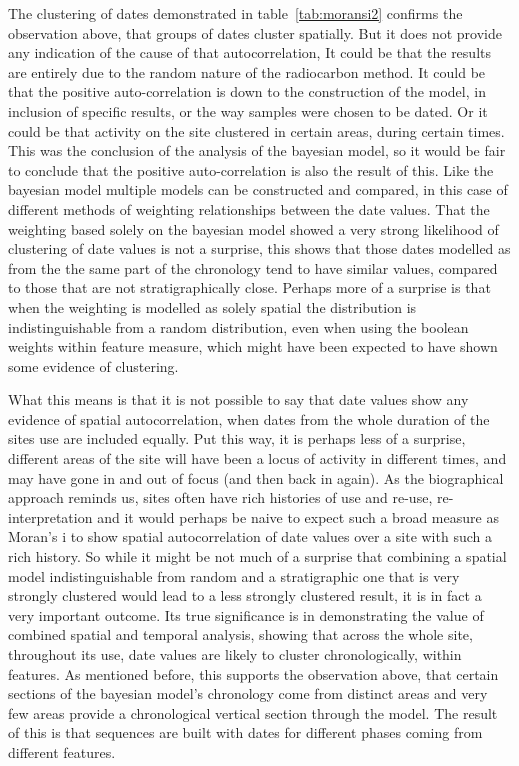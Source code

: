 The clustering of dates demonstrated in table~\ref{tab:moransi2} confirms the observation above, that groups of dates cluster spatially. But it does not provide any indication of the cause of that autocorrelation, It could be that the results are entirely due to the random nature of the radiocarbon method. It could be that the positive auto-correlation is down to the construction of the model, in inclusion of specific results, or the way samples were chosen to be dated. Or it could be that activity on the site clustered in certain areas, during certain times. This was the conclusion of the analysis of the bayesian model, so it would be fair to conclude that the positive auto-correlation is also the result of this. Like the bayesian model multiple models can be constructed and compared, in this case of different methods of weighting relationships between the date values. That the weighting based solely on the bayesian model showed a very strong likelihood of clustering of date values is not a surprise, this shows that those dates modelled as from the the same part of the chronology tend to have similar values, compared to those that are not stratigraphically close. Perhaps more of a surprise is that when the weighting is modelled as solely spatial the distribution is indistinguishable from a random distribution, even when using the boolean weights within feature measure, which might have been expected to have shown some evidence of clustering. 

What this means is that it is not possible to say that date values show any evidence of spatial autocorrelation, when dates from the whole duration of the sites use are included equally. Put this way, it is perhaps less of a surprise, different areas of the site will have been a locus of activity in different times, and may have gone in and out of focus (and then back in again). As the biographical approach reminds us, sites often have rich histories of use and re-use, re-interpretation and it would perhaps be naive to expect such a broad measure as Moran's i to show spatial autocorrelation of date values over a site with such a rich history. So while it might be not much of a surprise that combining a spatial model indistinguishable from random and a stratigraphic one that is very strongly clustered would lead to a less strongly clustered result, it is in fact a very important outcome. Its true significance is in demonstrating the value of combined spatial and temporal analysis, showing that across the whole site, throughout its use, date values are likely to cluster chronologically, within features. As mentioned before, this supports the observation above, that certain sections of the bayesian model's chronology come from distinct areas and very few areas provide a chronological vertical section through the model. The result of this is that sequences are built with dates for different phases coming from different features.

